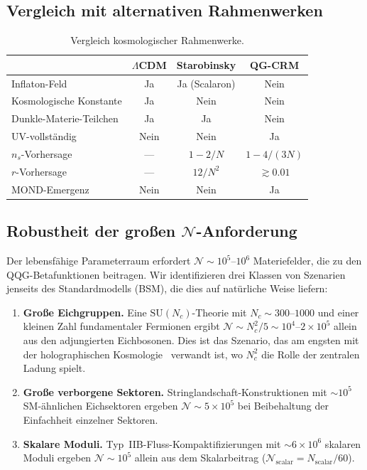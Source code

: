 \documentclass[aps,prd,twocolumn,superscriptaddress,nofootinbib]{revtex4-2}
\begin{document}
\subsection{Vergleich mit alternativen Rahmenwerken}

\begin{table}[h]
\caption{Vergleich kosmologischer Rahmenwerke.}
\begin{tabular}{lccc}
\toprule
 & $\Lambda$CDM & Starobinsky & QG-CRM \\
\midrule
Inflaton-Feld & Ja & Ja (Scalaron) & Nein \\
Kosmologische Konstante & Ja & Nein & Nein \\
Dunkle-Materie-Teilchen & Ja & Ja & Nein \\
UV-vollständig & Nein & Nein & Ja \\
$n_s$-Vorhersage & --- & $1-2/N$ & $1-4/(3N)$ \\
$r$-Vorhersage & --- & $12/N^2$ & $\gtrsim 0.01$ \\
MOND-Emergenz & Nein & Nein & Ja \\
\bottomrule
\end{tabular}
\label{tab:comparison}
\end{table}

\subsection{Robustheit der großen $\mathcal{N}$-Anforderung}
\label{sec:large-n}

Der lebensfähige Parameterraum erfordert $\mathcal{N} \sim 10^5$--$10^6$ Materiefelder, die zu den QQG-Betafunktionen beitragen. Wir identifizieren drei Klassen von Szenarien jenseits des Standardmodells (BSM), die dies auf natürliche Weise liefern:

\begin{enumerate}
\item \textbf{Große Eichgruppen.} Eine $\mathrm{SU}(N_c)$-Theorie mit $N_c \sim 300$--$1000$ und einer kleinen Zahl fundamentaler Fermionen ergibt $\mathcal{N} \sim N_c^2/5 \sim 10^4$--$2 \times 10^5$ allein aus den adjungierten Eichbosonen. Dies ist das Szenario, das am engsten mit der holographischen Kosmologie~\cite{Afshordi2017} verwandt ist, wo $N_c^2$ die Rolle der zentralen Ladung spielt.

\item \textbf{Große verborgene Sektoren.} Stringlandschaft-Konstruktionen mit $\sim 10^5$ SM-ähnlichen Eichsektoren ergeben $\mathcal{N} \sim 5 \times 10^5$ bei Beibehaltung der Einfachheit einzelner Sektoren.

\item \textbf{Skalare Moduli.} Typ~IIB-Fluss-Kompaktifizierungen mit $\sim 6 \times 10^6$ skalaren Moduli ergeben $\mathcal{N} \sim 10^5$ allein aus dem Skalarbeitrag ($\mathcal{N}_\mathrm{scalar} = N_\mathrm{scalar}/60$).
\end{enumerate}
\end{document}
